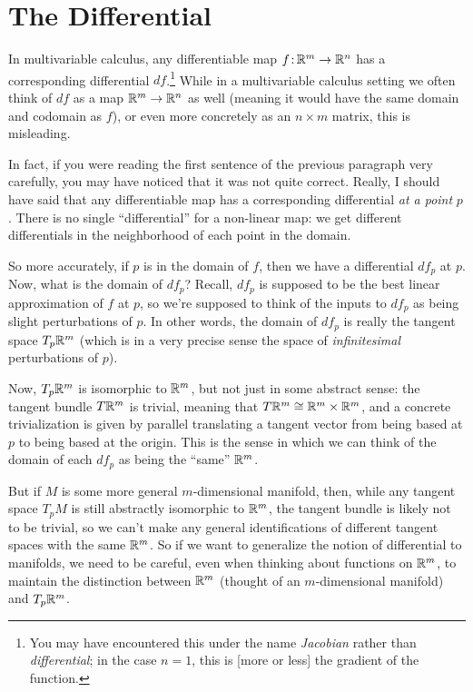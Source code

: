 
\section{The Differential}

In multivariable calculus, any differentiable map $f \colon\thinspace\!\! \mathbb{R}^m \to \mathbb{R}^n$ has a corresponding differential $df$.\footnote{You may have encountered this under the name \emph{Jacobian} rather than \emph{differential}; in the case $n=1$, this is [more or less] the gradient of the function.} While in a multivariable calculus setting we often think of $df$ as a map $\mathbb{R}^m \to \mathbb{R}^n$ as well (meaning it would have the same domain and codomain as $f$), or even more concretely as an $n \times m$ matrix, this is misleading.

In fact, if you were reading the first sentence of the previous paragraph very carefully, you may have noticed that it was not quite correct. Really, I should have said that any differentiable map has a corresponding differential \emph{at a point} $p$. There is no single ``differential'' for a non-linear map: we get different differentials in the neighborhood of each point in the domain.

So more accurately, if $p$ is in the domain of $f$, then we have a differential $df_p$ at $p$. Now, what is the domain of $df_p$? Recall, $df_p$ is supposed to be the best linear approximation of $f$ at $p$, so we're supposed to think of the inputs to $df_p$ as being slight perturbations of $p$. In other words, the domain of $df_p$ is really the tangent space $T_p \mathbb{R}^m$ (which is in a very precise sense the space of \emph{infinitesimal} perturbations of $p$).

Now, $T_p \mathbb{R}^m$ is isomorphic to $\mathbb{R}^m$, but not just in some abstract sense: the tangent bundle $T\mathbb{R}^m$ is trivial, meaning that $T \mathbb{R}^m \cong \mathbb{R}^m \times \mathbb{R}^m$, and a concrete trivialization is given by parallel translating a tangent vector from being based at $p$ to being based at the origin. This is the sense in which we can think of the domain of each $df_p$ as being the ``same'' $\mathbb{R}^m$.

But if $M$ is some more general $m$-dimensional manifold, then, while any tangent space $T_p M$ is still abstractly isomorphic to $\mathbb{R}^m$, the tangent bundle is likely not to be trivial, so we can't make any general identifications of different tangent spaces with the same $\mathbb{R}^m$. So if we want to generalize the notion of differential to manifolds, we need to be careful, even when thinking about functions on $\mathbb{R}^m$, to maintain the distinction between $\mathbb{R}^m$ (thought of an $m$-dimensional manifold) and $T_p \mathbb{R}^m$.

